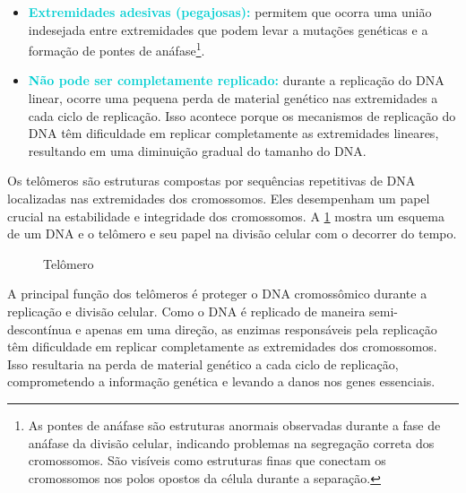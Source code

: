 \documentclass[11pt,a4paper]{article}
\begin{document}
    \begin{itemize}
        \item \textcolor{DarkTurquoise}{\textbf{Extremidades adesivas (pegajosas):}} permitem que ocorra uma união indesejada entre extremidades que podem levar a mutações genéticas e a formação de pontes de anáfase\footnote{As pontes de anáfase são estruturas anormais observadas durante a fase de anáfase da divisão celular, indicando problemas na segregação correta dos cromossomos. São visíveis como estruturas finas que conectam os cromossomos nos polos opostos da célula durante a separação.}.
        \item \textcolor{DarkTurquoise}{\textbf{Não pode ser completamente replicado:}} durante a replicação do DNA linear, ocorre uma pequena perda de material genético nas extremidades a cada ciclo de replicação. Isso acontece porque os mecanismos de replicação do DNA têm dificuldade em replicar completamente as extremidades lineares, resultando em uma diminuição gradual do tamanho do DNA.
    \end{itemize}

    Os telômeros são estruturas compostas por sequências repetitivas de DNA localizadas nas extremidades dos cromossomos. Eles desempenham um papel crucial na estabilidade e integridade dos cromossomos. A \ref{fig:telomero} mostra um esquema de um DNA e o telômero e seu papel na divisão celular com o decorrer do tempo. 

    \begin{figure}[h]
        \centering
        \caption{Telômero}
        \label{fig:telomero}
    \end{figure}

    A principal função dos telômeros é proteger o DNA cromossômico durante a replicação e divisão celular. Como o DNA é replicado de maneira semi-descontínua e apenas em uma direção, as enzimas responsáveis pela replicação têm dificuldade em replicar completamente as extremidades dos cromossomos. Isso resultaria na perda de material genético a cada ciclo de replicação, comprometendo a informação genética e levando a danos nos genes essenciais.
\end{document}
